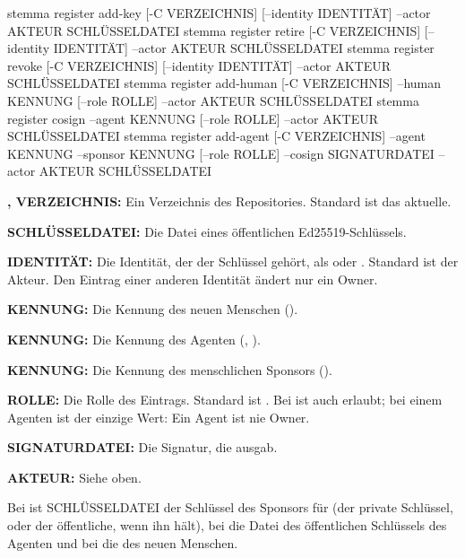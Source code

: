 \starttyping
stemma register add-key [-C VERZEICHNIS] [--identity IDENTITÄT] --actor AKTEUR SCHLÜSSELDATEI
stemma register retire [-C VERZEICHNIS] [--identity IDENTITÄT] --actor AKTEUR SCHLÜSSELDATEI
stemma register revoke [-C VERZEICHNIS] [--identity IDENTITÄT] --actor AKTEUR SCHLÜSSELDATEI
stemma register add-human [-C VERZEICHNIS] --human KENNUNG [--role ROLLE] --actor AKTEUR
        SCHLÜSSELDATEI
stemma register cosign --agent KENNUNG [--role ROLLE] --actor AKTEUR SCHLÜSSELDATEI
stemma register add-agent [-C VERZEICHNIS] --agent KENNUNG --sponsor KENNUNG [--role ROLLE]
        --cosign SIGNATURDATEI --actor AKTEUR SCHLÜSSELDATEI
\stoptyping

\startitemize
\item {\bf {},  VERZEICHNIS:} Ein Verzeichnis des Repositories.
Standard ist das aktuelle.
\item {\bf SCHLÜSSELDATEI:} Die Datei eines öffentlichen Ed25519-Schlüssels.
\item {\bf {} IDENTITÄT:} Die Identität, der der Schlüssel gehört, als
 oder . Standard ist der Akteur.
Den Eintrag einer anderen Identität ändert nur ein Owner.
\item {\bf {} KENNUNG:} Die Kennung des neuen Menschen ().
\item {\bf {} KENNUNG:} Die Kennung des Agenten (, ).
\item {\bf {} KENNUNG:} Die Kennung des menschlichen Sponsors ().
\item {\bf {} ROLLE:} Die Rolle des Eintrags. Standard ist .
Bei  ist auch  erlaubt;
bei einem Agenten ist  der einzige Wert: Ein Agent ist nie Owner.
\item {\bf {} SIGNATURDATEI:} Die Signatur, die  ausgab.
\item {\bf {} AKTEUR:} Siehe oben.
\stopitemize

Bei  ist SCHLÜSSELDATEI der Schlüssel des Sponsors für 
(der private Schlüssel, oder der öffentliche, wenn  ihn hält),
bei  die Datei des öffentlichen Schlüssels des Agenten
und bei  die des neuen Menschen.

